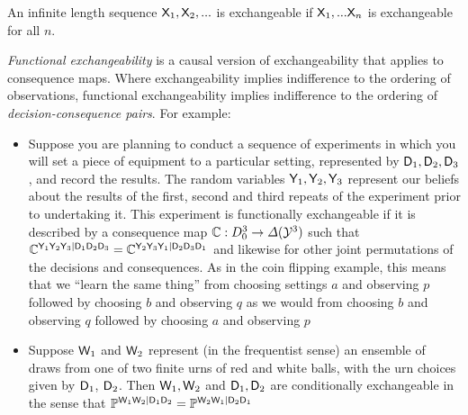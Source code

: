 An infinite length sequence $\mathsf{X}_1,\mathsf{X}_2,...$ is exchangeable if $\mathsf{X}_1,...\mathsf{X}_n$ is exchangeable for all $n$.

\emph{Functional exchangeability} is a causal version of exchangeability that applies to consequence maps. Where exchangeability implies indifference to the ordering of observations, functional exchangeability implies indifference to the ordering of \emph{decision-consequence pairs}. For example:

\begin{itemize}
    \item Suppose you are planning to conduct a sequence of experiments in which you will set a piece of equipment to a particular setting, represented by $\mathsf{D}_1,\mathsf{D}_2,\mathsf{D}_3$, and record the results. The random variables $\mathsf{Y}_1,\mathsf{Y}_2,\mathsf{Y}_3$ represent our beliefs about the results of the first, second and third repeats of the experiment prior to undertaking it. This experiment is functionally exchangeable if it is described by a consequence map $\mathbb{C}:D_0^3\to \Delta(\mathcal{Y}^3)$ such that $\mathbb{C}^{\mathsf{Y}_1\mathsf{Y}_2\mathsf{Y}_3|\mathsf{D}_1\mathsf{D}_2\mathsf{D}_3}=\mathbb{C}^{\mathsf{Y}_2\mathsf{Y}_3\mathsf{Y}_1|\mathsf{D}_2\mathsf{D}_3\mathsf{D}_1}$ and likewise for other joint permutations of the decisions and consequences. As in the coin flipping example, this means that we ``learn the same thing'' from choosing settings $a$ and observing $p$ followed by choosing $b$ and observing $q$ as we would from choosing $b$ and observing $q$ followed by choosing $a$ and observing $p$
    \item Suppose $\mathsf{W}_1$ and $\mathsf{W}_2$ represent (in the frequentist sense) an ensemble of draws from one of two finite urns of red and white balls, with the urn choices given by $\mathsf{D}_1$, $\mathsf{D}_2$. Then $\mathsf{W}_1, \mathsf{W}_2$ and $\mathsf{D}_1, \mathsf{D}_2$ are conditionally exchangeable in the sense that $\mathbb{P}^{\mathsf{W}_1\mathsf{W}_2|\mathsf{D}_1\mathsf{D}_2}=\mathbb{P}^{\mathsf{W}_2\mathsf{W}_1|\mathsf{D}_2\mathsf{D}_1}$
\end{itemize}

